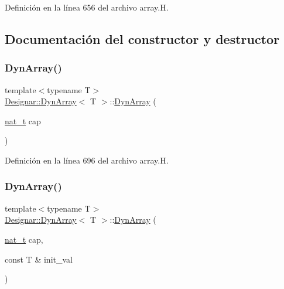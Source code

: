 Definición en la línea 656 del archivo array.\+H.



\subsection{Documentación del constructor y destructor}
\mbox{\label{class_designar_1_1_dyn_array_a9a00e1336657f98b96e7c38fc7da332c}} 
\subsubsection{\texorpdfstring{Dyn\+Array()}{DynArray()}\hspace{0.1cm}{\footnotesize\ttfamily [1/6]}}
{\footnotesize\ttfamily template$<$typename T$>$ \\
\hyperlink{class_designar_1_1_dyn_array}{Designar\+::\+Dyn\+Array}$<$ T $>$\+::\hyperlink{class_designar_1_1_dyn_array}{Dyn\+Array} (\begin{DoxyParamCaption}\item[{\hyperlink{namespace_designar_aa72662848b9f4815e7bf31a7cf3e33d1}{nat\+\_\+t}}]{cap }\end{DoxyParamCaption})\hspace{0.3cm}{\ttfamily [inline]}}



Definición en la línea 696 del archivo array.\+H.

\mbox{\label{class_designar_1_1_dyn_array_afc29c646a101761f0e7a6fb8080b38fd}} 
\subsubsection{\texorpdfstring{Dyn\+Array()}{DynArray()}\hspace{0.1cm}{\footnotesize\ttfamily [2/6]}}
{\footnotesize\ttfamily template$<$typename T$>$ \\
\hyperlink{class_designar_1_1_dyn_array}{Designar\+::\+Dyn\+Array}$<$ T $>$\+::\hyperlink{class_designar_1_1_dyn_array}{Dyn\+Array} (\begin{DoxyParamCaption}\item[{\hyperlink{namespace_designar_aa72662848b9f4815e7bf31a7cf3e33d1}{nat\+\_\+t}}]{cap,  }\item[{const T \&}]{init\+\_\+val }\end{DoxyParamCaption})\hspace{0.3cm}{\ttfamily [inline]}}



